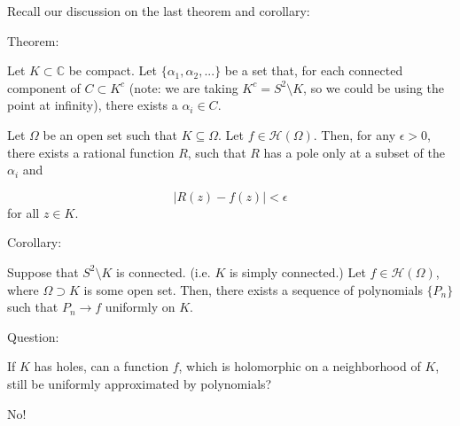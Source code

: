 \documentclass[10pt]{article}
\newcommand{\calH}{\mathcal{H}}
\begin{document}
Recall our discussion on the last theorem and corollary:

Theorem:

Let $K \subset \mathbb{C}$ be compact. Let $\{ \alpha_1, \alpha_2,... \}$ be a set that, for each connected component of $C \subset K^c$ (note: we are taking $K^c = S^2 \setminus K$, so we could be using the point at infinity), there exists a $\alpha_i \in C$.

Let $\Omega$ be an open set such that $K \subseteq \Omega$. Let $f \in \calH(\Omega)$. Then, for any $\epsilon > 0$, there exists a rational function $R$, such that $R$ has a pole only at a subset of the $\alpha_i$ and

$$ |R(z) - f(z) |< \epsilon $$ for all $z \in K$.

Corollary:

Suppose that $S^2 \setminus K$ is connected. (i.e. $K$ is simply connected.) Let $f \in \calH(\Omega)$, where $\Omega \supset K$ is some open set. Then, there exists a sequence of polynomials $\{ P_n \}$ such that $P_n \to f$ uniformly on $K$.

Question:

If $K$ has holes, can a function $f$, which is holomorphic on a neighborhood of $K$, still be uniformly approximated by polynomials?

No!
\end{document}
